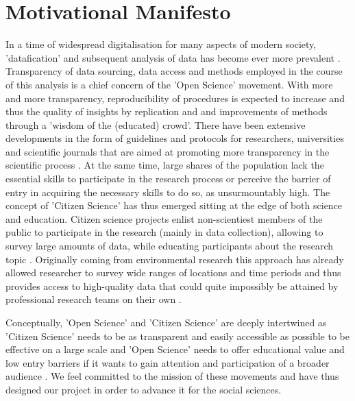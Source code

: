 \documentclass[preprint,12pt,authoryear]{elsarticle}
\begin{document}
\section{Motivational Manifesto}
In a time of widespread digitalisation for many aspects of modern society, 'datafication' and subsequent analysis of data has become ever more prevalent \cite{baack_datafication_2015, lycett_datafication:_2013}. Transparency of data sourcing, data access and methods employed in the course of this analysis is a chief concern of the 'Open Science' movement\cite{delfanti_open_2010}. With more and more transparency, reproducibility of procedures is expected to increase and thus the quality of insights by replication and and improvements of methods through a 'wisdom of the (educated) crowd'. There have been extensive developments in the form of guidelines and protocols for researchers, universities and scientific journals that are aimed at promoting more transparency in the scientific process \cite{nosek_promoting_2015, miguel_promoting_2014}. 
At the same time, large shares of the population lack the essential skills to participate in the research process or perceive the barrier of entry in acquiring the necessary skills to do so, as unsurmountably high. The concept of 'Citizen Science' has thus emerged sitting at the edge of both science and education. Citizen science projects enlist non-scientiest members of the public to participate in the research (mainly in data collection), allowing to survey large amounts of data, while educating participants about the research topic \cite{shirk_public_2012}. Originally coming from environmental research this approach has already allowed researcher to survey wide ranges of locations and time periods and thus provides access to high-quality data that could quite impossibly be attained by professional research teams on their own \cite{bonney_citizen_2009}.

Conceptually, 'Open Science' and 'Citizen Science' are deeply intertwined as 'Citizen Science' needs to be as transparent and easily accessible as possible to be effective on a large scale\cite{nov_dusting_2011} and 'Open Science' needs to offer educational value and low entry barriers if it wants to gain attention and participation of a broader audience \cite{newman_future_2012}. We feel committed to the mission of these movements and have thus designed our project in order to advance it for the social sciences. 
\end{document}
